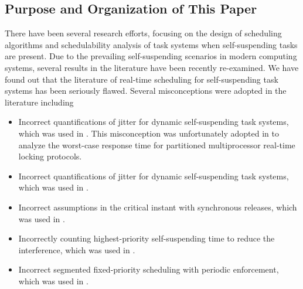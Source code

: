 \subsection{Purpose and Organization of This Paper}
There have been several research efforts, focusing on the design of scheduling algorithms and schedulability analysis of task systems when self-suspending tasks are present. Due to the prevailing self-suspending scenarios in modern computing systems, several results in the literature have been recently re-examined. We have found out that the literature of real-time scheduling for self-suspending task systems has been seriously flawed. Several misconceptions were adopted in the literature including 
\begin{itemize}
\item Incorrect quantifications of jitter for dynamic self-suspending
  task systems, which was used in
  \cite{ECRTS-AudsleyB04,RTAS-AudsleyB04,RTCSA-KimCPKH95,MingLiRTCSA1994}.  This
  misconception was unfortunately adopted in \cite{zeng-2011,bbb-2013,yang-2013,kim-2014,han-2014,carminati-2014,yang-2014,lakshmanan-2009} to analyze the worst-case response time for
  partitioned multiprocessor real-time locking protocols.
\item Incorrect quantifications of jitter for dynamic self-suspending
  task systems, which was used in  \cite{RTCSA-BletsasA05}.
\item Incorrect assumptions in the critical instant with
  synchronous releases, which was used in \cite{LR:rtas10}.
\item Incorrectly counting highest-priority self-suspending time to reduce the
  interference, which was used in  \cite{RTSS-KimANR13}. 
\item Incorrect segmented fixed-priority scheduling with periodic
  enforcement, which was used in \cite{RTSS-KimANR13,DBLP:journals/ieicet/DingTT09}.
\end{itemize}


